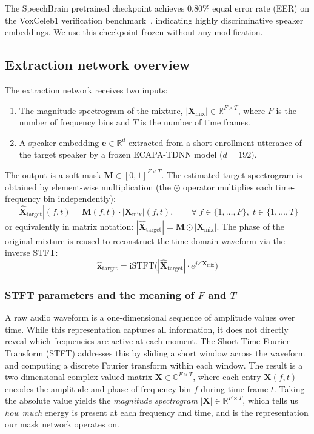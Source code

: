 \documentclass{article}
\begin{document}
The SpeechBrain pretrained checkpoint achieves 0.80\% equal error rate (EER) on the VoxCeleb1 verification benchmark~\citep{ECAPA}, indicating highly discriminative speaker embeddings. We use this checkpoint frozen without any modification.

\subsection{Extraction network overview}

The extraction network receives two inputs:
\begin{enumerate}
    \item The magnitude spectrogram of the mixture, $|\mathbf{X}_{\text{mix}}| \in \mathbb{R}^{F \times T}$, where $F$ is the number of frequency bins and $T$ is the number of time frames.
    \item A speaker embedding $\mathbf{e} \in \mathbb{R}^{d}$ extracted from a short enrollment utterance of the target speaker by a frozen ECAPA-TDNN model ($d = 192$).
\end{enumerate}

The output is a soft mask $\mathbf{M} \in [0,1]^{F \times T}$. The estimated target spectrogram is obtained by element-wise multiplication (the $\odot$ operator multiplies each time-frequency bin independently):
\[
    |\hat{\mathbf{X}}_{\text{target}}|(f,t) = \mathbf{M}(f,t) \cdot |\mathbf{X}_{\text{mix}}|(f,t), \qquad \forall\; f \in \{1,\dots,F\},\; t \in \{1,\dots,T\}
\]
or equivalently in matrix notation: $|\hat{\mathbf{X}}_{\text{target}}| = \mathbf{M} \odot |\mathbf{X}_{\text{mix}}|$.
The phase of the original mixture is reused to reconstruct the time-domain waveform via the inverse STFT:
\[
    \hat{\mathbf{x}}_{\text{target}} = \text{iSTFT}\!\bigl(|\hat{\mathbf{X}}_{\text{target}}| \cdot e^{j\angle \mathbf{X}_{\text{mix}}}\bigr)
\]

\subsubsection{STFT parameters and the meaning of $F$ and $T$}

A raw audio waveform is a one-dimensional sequence of amplitude values over time. While this representation captures all information, it does not directly reveal which frequencies are active at each moment. The Short-Time Fourier Transform (STFT) addresses this by sliding a short window across the waveform and computing a discrete Fourier transform within each window. The result is a two-dimensional complex-valued matrix $\mathbf{X} \in \mathbb{C}^{F \times T}$, where each entry $\mathbf{X}(f, t)$ encodes the amplitude and phase of frequency bin $f$ during time frame $t$. Taking the absolute value yields the \emph{magnitude spectrogram} $|\mathbf{X}| \in \mathbb{R}^{F \times T}$, which tells us \emph{how much} energy is present at each frequency and time, and is the representation our mask network operates on.
\end{document}
